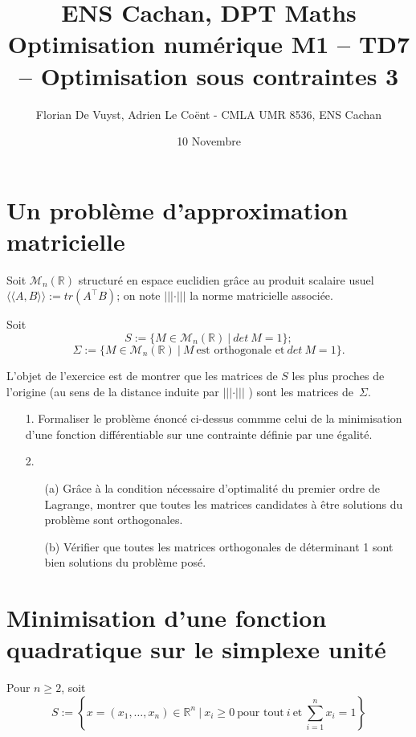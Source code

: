 \documentclass[11pt, a4paper]{article}
\title{ENS Cachan, DPT Maths \\ [1cm]
Optimisation numérique M1 -- TD7 -- Optimisation sous contraintes 3}
\author{Florian De Vuyst, Adrien Le Co\"ent - CMLA UMR 8536, ENS Cachan}
\date{10 Novembre}
\begin{document}
%
\maketitle
%
\section*{Un problème d'approximation matricielle}
%
Soit $\mathcal{M}_n(\mathbb{R})$ structuré en espace euclidien grâce au produit scalaire usuel $\langle \langle A,B \rangle \rangle := tr(A^\top B)$; on note $\vert\vert\vert \cdot \vert\vert\vert$
la norme matricielle associée.

Soit
$$ S:= \lbrace M \in \mathcal{M}_n(\mathbb{R}) \ \vert \ det \ M = 1 \rbrace ; $$
$$ \Sigma := \lbrace M \in \mathcal{M}_n(\mathbb{R}) \ \vert \ M \ \text{est orthogonale et} \ det \ M = 1 \rbrace . $$


L'objet de l'exercice est de montrer que les matrices de $S$ les plus proches de l'origine (au sens de la distance induite par $\vert\vert\vert \cdot \vert\vert\vert$ ) sont les matrices de~$\Sigma$.


\begin{itemize}
 \item[1.] Formaliser le problème énoncé ci-dessus commme celui de la minimisation d'une fonction différentiable sur une contrainte définie par une égalité.
 
 \item[2.] \begin{itemize}
            \item[(a)] Grâce à la condition nécessaire d'optimalité du premier ordre de Lagrange, montrer que toutes les matrices candidates à
            être solutions du problème sont orthogonales.
            \item[(b)] Vérifier que toutes les matrices orthogonales de déterminant 1 sont bien solutions du problème posé.
           \end{itemize}
\end{itemize}



\section*{Minimisation d'une fonction quadratique sur le simplexe unité}
Pour $n \geq 2$, soit
$$ S := \left \lbrace x = (x_1,\dots ,x_n) \in \mathbb{R}^n \ \vert \ x_i \geq 0 \ \text{pour tout} \ i \ \text{et} \ \sum_{i=1}^n x_i = 1 \right \rbrace$$
\end{document}
